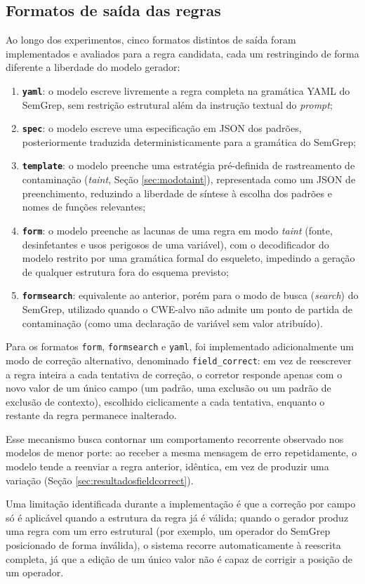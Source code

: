 \documentclass[
    12pt,                %
    openright,           %
    oneside,             %
    a4paper,             %
    english,             %
    brazil               %
]{abntex2}
\newcommand{\novo}[1]{{\color{red}#1}}
\begin{document}
\subsection{Formatos de saída das regras}
\label{sec:formatosregras}
\par
Ao longo dos experimentos, cinco formatos distintos de saída foram implementados e avaliados para a regra candidata, cada um restringindo de forma diferente a liberdade do modelo gerador:
\begin{enumerate}
  \item \textbf{\texttt{yaml}}: o modelo escreve livremente a regra completa na gramática YAML do SemGrep, sem restrição estrutural além da instrução textual do \textit{prompt};
  \item \textbf{\texttt{spec}}: o modelo escreve uma especificação em JSON dos padrões, posteriormente traduzida deterministicamente para a gramática do SemGrep;
  \item \textbf{\texttt{template}}: o modelo preenche uma estratégia pré-definida de rastreamento de contaminação (\textit{taint}\novo{, Seção \ref{sec:modotaint}}), representada como um JSON de preenchimento, reduzindo a liberdade de síntese à escolha dos padrões e nomes de funções relevantes;
  \item \textbf{\texttt{form}}: o modelo preenche as lacunas de uma regra em modo \textit{taint} (fonte, desinfetantes e usos perigosos de uma variável), com o decodificador do modelo restrito por uma gramática formal do esqueleto, impedindo a geração de qualquer estrutura fora do esquema previsto;
  \item \textbf{\texttt{formsearch}}: equivalente ao anterior, porém para o modo de busca (\textit{search}) do SemGrep, utilizado quando o CWE-alvo não admite um ponto de partida de contaminação (como uma declaração de variável sem valor atribuído).
\end{enumerate}
\par
Para os formatos \texttt{form}, \texttt{formsearch} e \texttt{yaml}, foi implementado adicionalmente um modo de correção alternativo, denominado \texttt{field\_correct}: em vez de reescrever a regra inteira a cada tentativa de correção, o corretor responde apenas com o novo valor de um único campo (um padrão, uma exclusão ou um padrão de exclusão de contexto), escolhido ciclicamente a cada tentativa, enquanto o restante da regra permanece inalterado.
\par
Esse mecanismo busca contornar um comportamento recorrente observado nos modelos de menor porte: ao receber a mesma mensagem de erro repetidamente, o modelo tende a reenviar a regra anterior, idêntica, em vez de produzir uma variação (Seção \ref{sec:resultadosfieldcorrect}).
\par
Uma limitação identificada durante a implementação é que a correção por campo só é aplicável quando a estrutura da regra já é válida; quando o gerador produz uma regra com um erro estrutural (por exemplo, um operador do SemGrep posicionado de forma inválida), o sistema recorre automaticamente à reescrita completa, já que a edição de um único valor não é capaz de corrigir a posição de um operador.
\end{document}
